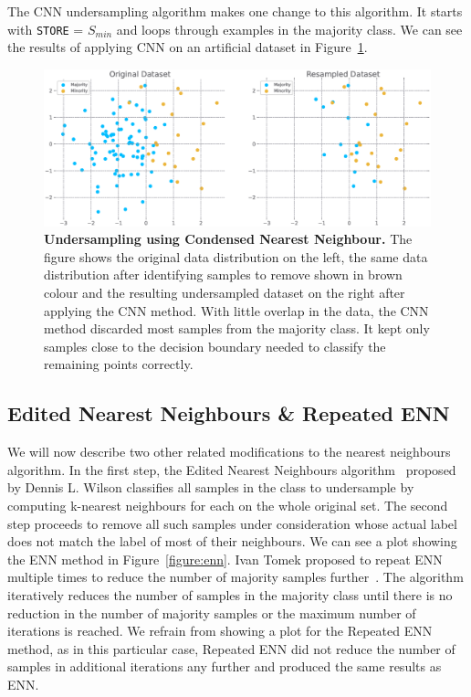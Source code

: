 The CNN undersampling algorithm makes one change to this algorithm. It starts with \texttt{STORE} =
$S_{min}$ and loops through examples in the majority class. We can see the results of applying CNN
on an artificial dataset in Figure~\ref{figure:cnn}.

\begin{figure}
    \centering
    \includegraphics[width=\linewidth]{figures/cnn.eps}
    \caption{
        \textbf{Undersampling using Condensed Nearest Neighbour.} The figure shows the original
        data distribution on the left, the same data distribution after identifying samples to
        remove shown in brown colour and the resulting undersampled dataset on the right after
        applying the CNN method. With little overlap in the data, the CNN method discarded most
        samples from the majority class. It kept only samples close to the decision boundary needed
        to classify the remaining points correctly.
    }
    \label{figure:cnn}
\end{figure}


\subsection{Edited Nearest Neighbours \& Repeated ENN}
\label{subsection:enn}

We will now describe two other related modifications to the nearest neighbours algorithm. In the
first step, the Edited Nearest Neighbours algorithm~\cite{enn} proposed by Dennis L. Wilson
classifies all samples in the class to undersample by computing k-nearest neighbours for each on
the whole original set. The second step proceeds to remove all such samples under consideration
whose actual label does not match the label of most of their neighbours. We can see a plot showing
the ENN method in Figure~\ref{figure:enn}. Ivan Tomek proposed to repeat ENN multiple times to
reduce the number of majority samples further~\cite{repeated-enn}. The algorithm iteratively
reduces the number of samples in the majority class until there is no reduction in the number of
majority samples or the maximum number of iterations is reached. We refrain from showing a plot for
the Repeated ENN method, as in this particular case, Repeated ENN did not reduce the number of
samples in additional iterations any further and produced the same results as ENN.

